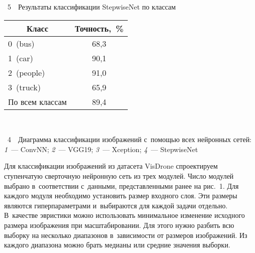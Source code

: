 \begin{multicols}{2}
\pagebreak





\vspace*{-5pt}

  \begin{center}
  \parbox{142pt}{{{\tablename~5}\ \ \small{Результаты классификации StepwiseNet по классам
}}
}

  \vspace*{6pt}
  
  {\small \begin{tabular}{|l|c|}
  \hline
 \multicolumn{1}{|c|}{Класс}&Точность,~\%\\ 
\hline 
0~(bus)&68,3\\ 
1~(car)&90,1\\ 
2~(people)&91,0\\ 
3~(truck)&65,9\\ 
\hline
По всем классам&89,4\\
\hline
\end{tabular}
}
\vspace*{8pt}
\end{center}

{ \begin{center}  %
 \vspace*{-2pt}
    \mbox{%
\epsfxsize=78.952mm
}

\end{center}

\vspace*{-3pt}

\noindent
{{\figurename~4}\ \ \small{Диаграмма классификации изображений с~по\-мощью всех нейронных сетей: 
\textit{1}~--- ConvNN; \textit{2}~--- VGG19; \textit{3}~--- Xception; \textit{4}~--- StepwiseNet
}}}

\vspace*{9pt}








  
  Для классификации изображений из датасета VisDrone спроектируем 
ступенчатую сверточную нейронную сеть из трех модулей. Чис\-ло модулей 
выбрано в~соответствии с~данными, пред\-став\-лен\-ны\-ми ранее на рис.~1. Для 
каждого модуля необходимо установить размер входного слоя. Эти размеры 
являются ги\-пер\-па\-ра\-мет\-ра\-ми и~выбираются для каж\-дой задачи отдельно. 
В~качестве эвристики мож\-но использовать минимальное изменение исходного 
размера изображения при масштабировании. Для этого нуж\-но разбить всю 
выборку на несколько диапазонов в~за\-ви\-си\-мости от размеров изображений. Из 
каж\-до\-го диапазона можно брать медианы или сред\-ние значения выборки.
  

\end{multicols}
